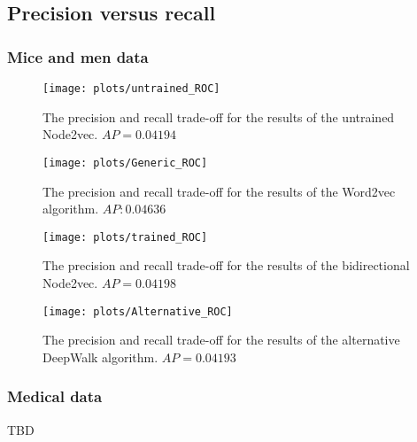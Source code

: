 \documentclass{article}
\begin{document}
 \subsection{Precision versus recall}
  \subsubsection{Mice and men data}
  \begin{figure}[H]
   \centering
   \texttt{[image: plots/untrained\_ROC]}
   \caption[Precision-recall curve untrained mice]{The precision and recall trade-off for the results of the untrained Node2vec. $AP = 0.04194$}
   \label{ROC_untrained}
  \end{figure}
 
  \begin{figure}[H]
   \centering
   \texttt{[image: plots/Generic\_ROC]}
   \caption[Precision-recall curve pre-trained mice]{The precision and recall trade-off for the results of the Word2vec algorithm. $AP: 0.04636$}
   \label{ROC_generic}
  \end{figure}
 
  \begin{figure}[H]
   \centering
   \texttt{[image: plots/trained\_ROC]}
   \caption[Precision-recall curve trained mice model]{The precision and recall trade-off for the results of the bidirectional Node2vec. $AP = 0.04198$}
   \label{ROC_trained}
  \end{figure}
  
  \begin{figure}[H]
   \centering
   \texttt{[image: plots/Alternative\_ROC]}
   \caption[Precision-recall curve DeepWalk mice]{The precision and recall trade-off for the results of the alternative DeepWalk algorithm. $AP = 0.04193$}
   \label{ROC_alternative}
  \end{figure}
   \subsubsection{Medical data}
   TBD
  
\end{document}
